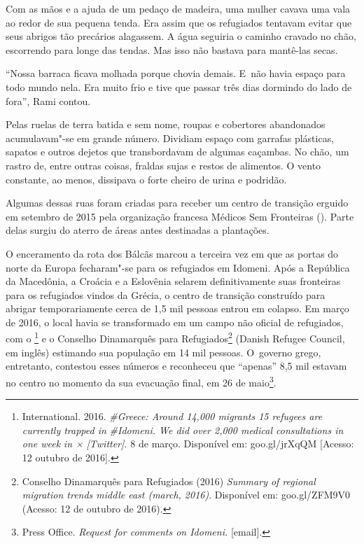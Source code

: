 Com as mãos e a ajuda de um pedaço de madeira, uma mulher cavava uma vala  
ao redor de sua pequena tenda. Era assim que os refugiados tentavam evitar
que seus abrigos tão precários alagassem. A água seguiria o caminho cravado
no chão, escorrendo para longe das tendas. Mas isso não bastava para mantê-las
secas. 

``Nossa barraca ficava molhada porque chovia demais. E~não havia espaço
para todo mundo nela. Era muito frio e tive que passar
três dias dormindo do lado de fora'', Rami contou.

Pelas ruelas de terra batida e sem nome, roupas e cobertores abandonados 
acumulavam"-se em grande número. Dividiam espaço com garrafas plásticas,
sapatos e outros dejetos que transbordavam de algumas caçambas. No chão,
um rastro de, entre outras coisas, fraldas sujas e restos de alimentos.
O vento constante, ao menos, dissipava o forte cheiro de urina e podridão.

Algumas dessas ruas foram criadas para receber um centro de transição 
erguido em setembro de 2015 pela organização francesa Médicos Sem Fronteiras
(). Parte delas surgiu do aterro de áreas antes destinadas a plantações. 

O enceramento da rota dos Bálcãs marcou a terceira vez em que as portas do
norte da Europa fecharam"-se para os refugiados em Idomeni. Após a
República da Macedônia, a Croácia e a Eslovênia selarem definitivamente suas
fronteiras para os refugiados vindos da Grécia, o centro de transição
construído para abrigar temporariamente cerca de 1,5 mil pessoas
entrou em colapso. Em março de 2016, o local havia se transformado em um campo
não oficial de refugiados, com o \footnote{  International. 2016.
\emph{{\#Greece}}\emph{:
Around 14,000 migrants 15 refugees are currently trapped in}
\emph{{\#Idomeni}}\emph{.
We did over 2,000 medical consultations in one week} \emph{in
×}\emph{ {[}Twitter{]}.} 8 de março. Disponível em:
{goo.gl/jrXqQM}
{[}Acesso: 12 outubro de 2016{]}.}  e o
Conselho Dinamarquês para Refugiados\footnote{ Conselho Dinamarquês para Refugiados (2016)
\emph{Summary of regional migration trends middle east (march, 2016)}.
Disponível em:
goo.gl/ZFM9V0
(Acesso: 12 de outubro de 2016).}  (Danish
Refugee Council, em inglês) estimando sua população em 14 mil pessoas. O~governo grego, entretanto, contestou esses números e reconheceu que
``apenas'' 8,5 mil estavam no centro no momento da sua evacuação final,
em 26 de maio\footnote{ Press Office. \emph{Request for comments on
Idomeni}\emph{.} {[}email{]}.}.

